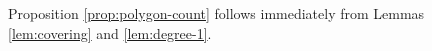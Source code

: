 \documentclass[12pt]{amsart}
\begin{document}
Proposition \ref{prop:polygon-count} follows immediately from Lemmas \ref{lem:covering} and \ref{lem:degree-1}.





\end{document}
